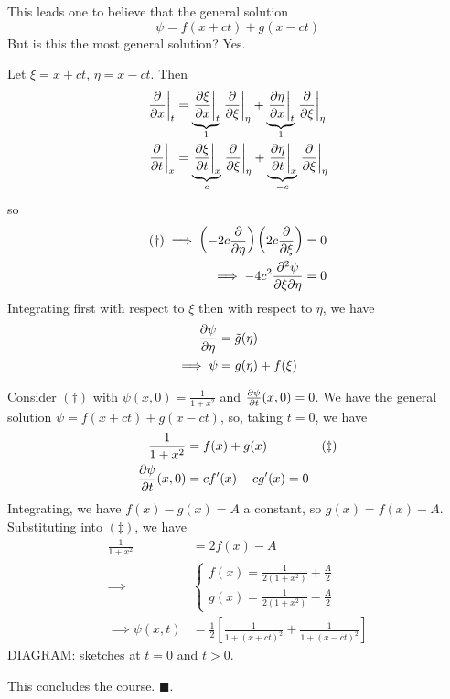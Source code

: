 \documentclass{../template/note}
\begin{document}
    This leads one to believe that the general solution
    \[
        \psi = f(x+ct) + g(x-ct)
    \]
    But is this the most general solution? Yes.

    Let \(\xi = x + ct\), \(\eta = x - ct\). Then
    \begin{align*}
        \pd[t]{}{x} &= \underbrace{\pd[t]{\xi}{x}}_1 \pd[\eta]{}{\xi} + \underbrace{\pd[t]{\eta}{x}}_1 \pd[\eta]{}{\xi} \\
        \pd[x]{}{t} &= \underbrace{\pd[x]{\xi}{t}}_{c} \pd[\eta]{}{\xi} + \underbrace{\pd[x]{\eta}{t}}_{-c} \pd[\eta]{}{\xi} 
    \end{align*}
    so
    \begin{align*}
        (\dagger) \implies \left(-2c \pd{}{\eta}\right)\left(2c \pd{}{\xi}\right) &= 0 \\
        \implies -4c^2 \pd{^2\psi}{\xi \partial \eta} &= 0
    \end{align*}
    Integrating first with respect to \(\xi\) then with respect to \(\eta\), we have
    \begin{align*}
        \pd \psi \eta &= \tilde g(\eta) \\
        \implies \psi &= g(\eta) + f(\xi)
    \end{align*}
    
    \begin{example}
        Consider \((\dagger)\) with \(\psi(x, 0) = \frac{1}{1+x^2}\) and \(\pd \psi t (x, 0) = 0\). We have the general solution \(\psi = f(x+ct) + g(x-ct)\), so, taking \(t=0\), we have
        \begin{align*}
            \frac{1}{1+x^2} &= f(x) + g(x) && (\ddagger) \\
            \pd \psi t (x, 0) &= cf'(x) - cg'(x) = 0
        \end{align*}
        Integrating, we have \(f(x) - g(x) = A\) a constant, so \(g(x) = f(x) - A\). Substituting into \((\ddagger)\), we have
        \begin{align*}
            \frac{1}{1+x^2} &= 2f(x) - A \\
            \implies &
            \begin{cases}
                f(x) = \frac{1}{2(1+x^2)} + \frac{A}{2} \\
                g(x) = \frac{1}{2(1+x^2)} - \frac{A}{2}
            \end{cases} \\
            \implies \psi(x, t) &= \frac{1}{2} \left[\frac{1}{1+(x+ct)^2}+\frac{1}{1+(x-ct)^2}\right]
        \end{align*}
        DIAGRAM: sketches at \(t=0\) and \(t>0\).
    \end{example}
    
    This concludes the course. \(\blacksquare\).
    
    
    
    
    
\end{document}
